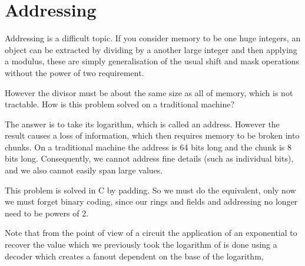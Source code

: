 \documentclass[oneside]{book}
\theoremstyle{plain}
\theoremstyle{definition}
\theoremstyle{plain}
\begin{document}
\section{Addressing}
Addressing is a difficult topic. If you consider memory to be one
huge integers, an object can be extracted by dividing by a
another large integer and then applying a modulus, these are
simply generalisation of the usual shift and mask operations without
the power of two requirement.

However the divisor must be about the same size as all of memory,
which is not tractable. How is this problem solved on a traditional
machine?

The answer is to take its logarithm, which is called an address.
However the result causes a loss of information, which then requires
memory to be broken into chunks. On a traditional machine the address
is 64 bits long and the chunk is 8 bits long. Consequently, we cannot
address fine details (such as individual bits), and we also cannot
easily span large values.

This problem is solved in C by padding. So we must do the equivalent,
only now we must forget binary coding, since our rings and fields
and addressing no longer need to be powers of 2.

Note that from the point of view of a circuit the application of an exponential
to recover the value which we previously took the logarithm of is done
using a decoder which creates a fanout dependent on the base of the logarithm,
\end{document}
